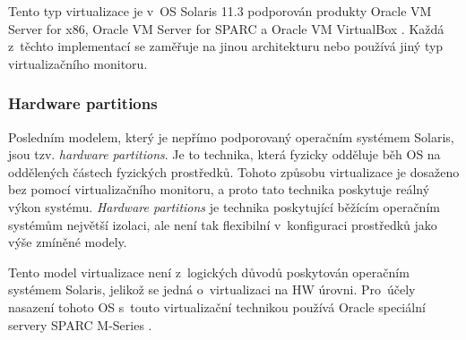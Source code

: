 Tento typ virtualizace je v~OS Solaris 11.3 podporován produkty Oracle VM Server for x86, Oracle VM Server for SPARC a Oracle
VM VirtualBox \cite{oracle:virtualization:technologies}. Každá z~těchto implementací se zaměřuje na jinou architekturu nebo
používá jiný typ virtualizačního monitoru.
\subsubsection{Hardware partitions}
\label{chapter:solaris:virtualization:hw_partition}
Posledním modelem, který je nepřímo podporovaný operačním systémem Solaris, jsou tzv. \textit{hardware partitions}. Je to technika,
která fyzicky odděluje běh OS na oddělených částech fyzických prostředků. Tohoto způsobu virtualizace je dosaženo
bez pomocí virtualizačního monitoru, a proto tato technika poskytuje reálný výkon systému. \textit{Hardware partitions} je technika
poskytující běžícím operačním systémům největší izolaci, ale není tak flexibilní v~konfiguraci prostředků jako výše
zmíněné modely.

Tento model virtualizace není z~logických důvodů poskytován operačním systémem Solaris, jelikož se jedná o~virtualizaci na HW úrovni.
Pro~účely nasazení tohoto OS s~touto virtualizační technikou používá Oracle speciální servery SPARC M-Series 
\cite{oracle:virtualization:technologies}.